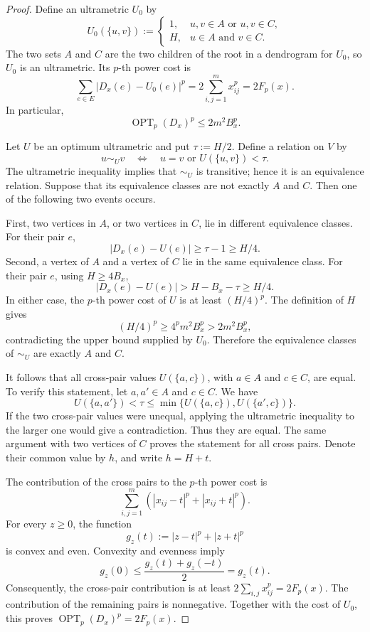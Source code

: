 \documentclass[11pt]{article}
\theoremstyle{definition}
\newcommand{\OPT}{\operatorname{OPT}}
\newcommand{\Fp}{F_p}
\begin{document}
\begin{proof}
Define an ultrametric \(U_0\) by
\[
 U_0(\{u,v\}):=
 \begin{cases}
 1,&u,v\in A\text{ or }u,v\in C,\\
 H,&u\in A\text{ and }v\in C.
 \end{cases}
\]
The two sets \(A\) and \(C\) are the two children of the root in a dendrogram
for \(U_0\), so \(U_0\) is an ultrametric.  Its \(p\)-th power cost is
\[
 \sum_{e\in E}|D_x(e)-U_0(e)|^p
 =2\sum_{i,j=1}^m x_{ij}^p
 =2\Fp(x).
\]
In particular,
\[
 \OPT_p(D_x)^p\le2m^2B_x^p.
\]

Let \(U\) be an optimum ultrametric and put \(\tau:=H/2\).  Define a relation
on \(V\) by
\[
 u\sim_U v
 \quad\Longleftrightarrow\quad
 u=v\text{ or }U(\{u,v\})<\tau.
\]
The ultrametric inequality implies that \(\sim_U\) is transitive; hence it is
an equivalence relation.  Suppose that its equivalence classes are not
exactly \(A\) and \(C\).  Then one of the following two events occurs.

First, two vertices in \(A\), or two vertices in \(C\), lie in different
equivalence classes.  For their pair \(e\),
\[
 |D_x(e)-U(e)|\ge\tau-1\ge H/4.
\]
Second, a vertex of \(A\) and a vertex of \(C\) lie in the same equivalence
class.  For their pair \(e\), using \(H\ge4B_x\),
\[
 |D_x(e)-U(e)|
 > H-B_x-\tau
 \ge H/4.
\]
In either case, the \(p\)-th power cost of \(U\) is at least \((H/4)^p\).
The definition of \(H\) gives
\[
 (H/4)^p
 \ge 4^p m^2B_x^p
 >2m^2B_x^p,
\]
contradicting the upper bound supplied by \(U_0\).  Therefore the
equivalence classes of \(\sim_U\) are exactly \(A\) and \(C\).

It follows that all cross-pair values \(U(\{a,c\})\), with \(a\in A\) and
\(c\in C\), are equal.  To verify this statement, let \(a,a'\in A\) and
\(c\in C\).  We have
\[
 U(\{a,a'\})<\tau
 \le\min\{U(\{a,c\}),U(\{a',c\})\}.
\]
If the two cross-pair values were unequal, applying the ultrametric inequality
to the larger one would give a contradiction.  Thus they are equal.  The
same argument with two vertices of \(C\) proves the statement for all cross
pairs.  Denote their common value by \(h\), and write \(h=H+t\).

The contribution of the cross pairs to the \(p\)-th power cost is
\[
 \sum_{i,j=1}^m
 \left(|x_{ij}-t|^p+|x_{ij}+t|^p\right).
\]
For every \(z\ge0\), the function
\[
 g_z(t):=|z-t|^p+|z+t|^p
\]
is convex and even.  Convexity and evenness imply
\[
 g_z(0)
 \le\frac{g_z(t)+g_z(-t)}2
 =g_z(t).
\]
Consequently, the cross-pair contribution is at least
\(2\sum_{i,j}x_{ij}^p=2\Fp(x)\).  The contribution of the remaining pairs is
nonnegative.  Together with the cost of \(U_0\), this proves
\(\OPT_p(D_x)^p=2\Fp(x)\).
\end{proof}
\end{document}
